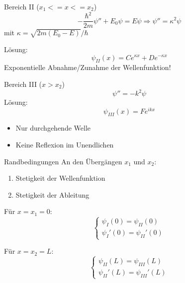 \documentclass{beamer}
\begin{document}
    \begin{frame}{Bereich II ($x_1 <= x <= x_2$)}
        \[
            -\frac{\hbar^2}{2m}\psi'' + E_0\psi = E\psi \Rightarrow \psi'' = \kappa^2\psi
        \]
        mit $\kappa = \sqrt{2m(E_0 - E)}/\hbar$

        Lösung:
        \[
            \psi_{II}(x) = Ce^{\kappa x} + De^{-\kappa x}
        \]
        Exponentielle Abnahme/Zunahme der Wellenfunktion!
    \end{frame}

    \begin{frame}{Bereich III ($x > x_2$)}
        \[
            \psi'' = -k^2\psi
        \]
        Lösung:
        \[
            \psi_{III}(x) = Fe^{ikx}
        \]
        \begin{itemize}
            \item Nur durchgehende Welle
            \item Keine Reflexion im Unendlichen
        \end{itemize}
    \end{frame}

    \begin{frame}{Randbedingungen}
        An den Übergängen $x_1$ und $x_2$:
        \begin{enumerate}
            \item Stetigkeit der Wellenfunktion
            \item Stetigkeit der Ableitung
        \end{enumerate}

        Für $x = x_1 = 0$:
        \[
            \begin{cases}
                \psi_I(0) = \psi_{II}(0) \\
                \psi_I'(0) = \psi_{II}'(0)
            \end{cases}
        \]

        Für $x = x_2 = L$:
        \[
            \begin{cases}
                \psi_{II}(L) = \psi_{III}(L) \\
                \psi_{II}'(L) = \psi_{III}'(L)
            \end{cases}
        \]
    \end{frame}
\end{document}
